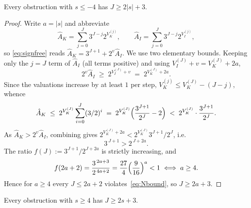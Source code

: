 \documentclass[11pt,reqno]{amsart}
\newcommand{\Vk}{V_{K}}
\newcommand{\Vi}{V_{I}}
\begin{document}
\begin{lemma}\label{lem:depth-negbig}
Every obstruction with $s \le -4$ has $J \ge 2|s| + 3$.
\end{lemma}

\begin{proof}
Write $a = |s|$ and abbreviate
\[
\hat A_K = \sum_{j=0}^{J} 3^{J-j} 2^{\Vk^{(j)}}, \qquad
\hat A_I = \sum_{j=0}^{J} 3^{J-j} 2^{\Vi^{(j)}},
\]
so \eqref{eq:signfree} reads $\hat A_K = 3^{J+1} + 2^{v} \hat A_I$. We use two
elementary bounds. Keeping only the $j = J$ term of $\hat A_I$ (all terms
positive) and using $\Vi^{(J)} + v = \Vk^{(J)} + 2a$,
\[
2^{v} \hat A_I \;\ge\; 2^{\Vi^{(J)}+v} \;=\; 2^{\Vk^{(J)} + 2a}.
\]
Since the valuations increase by at least $1$ per step, $\Vk^{(j)} \le \Vk^{(J)} - (J-j)$, whence
\[
\hat A_K \;\le\; 2^{\Vk^{(J)}} \sum_{i=0}^{J} (3/2)^{i}
   \;=\; 2^{\Vk^{(J)}}\Bigl(\frac{3^{J+1}}{2^{J}} - 2\Bigr)
   \;<\; 2^{\Vk^{(J)}} \cdot \frac{3^{J+1}}{2^{J}} .
\]
As $\hat A_K > 2^{v}\hat A_I$, combining gives $2^{\Vk^{(J)}+2a} < 2^{\Vk^{(J)}} 3^{J+1}/2^{J}$, i.e.
\begin{equation}\label{eq:Nbound}
3^{\,J+1} > 2^{\,J + 2a}. \tag{N}
\end{equation}
The ratio $f(J) := 3^{J+1}/2^{J+2a}$ is strictly increasing, and
\[
f(2a+2) = \frac{3^{\,2a+3}}{2^{\,4a+2}} = \frac{27}{4}\Bigl(\frac{9}{16}\Bigr)^{a} < 1
\iff a \ge 4 .
\]
Hence for $a \ge 4$ every $J \le 2a+2$ violates~\eqref{eq:Nbound}, so $J \ge 2a+3$.
\qedhere
\end{proof}

\begin{lemma}\label{lem:depth-posbig}
Every obstruction with $s \ge 4$ has $J \ge 2s + 3$.
\end{lemma}
\end{document}
